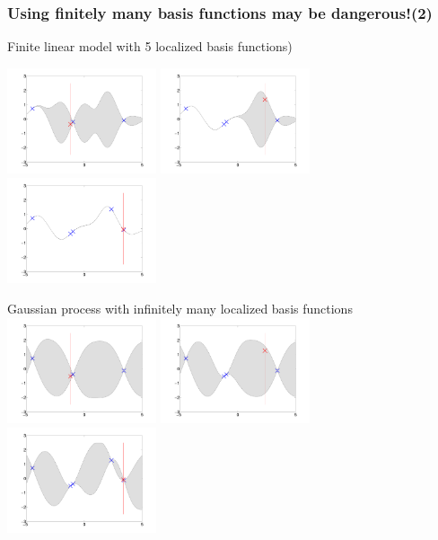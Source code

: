 \begin{frame}
\frametitle{\!\!\!Using finitely many basis functions may be dangerous!(2)}

Finite linear model with 5 localized basis functions)

\includegraphics[width=0.33\textwidth]{seq_linear_M4.pdf}
\includegraphics[width=0.33\textwidth]{seq_linear_M5.pdf}
\includegraphics[width=0.33\textwidth]{seq_linear_M6.pdf}

Gaussian process with infinitely many localized basis functions
\includegraphics[width=0.33\textwidth]{seq_fullGP_M4.pdf}
\includegraphics[width=0.33\textwidth]{seq_fullGP_M5.pdf}
\includegraphics[width=0.33\textwidth]{seq_fullGP_M6.pdf}


\end{frame}


